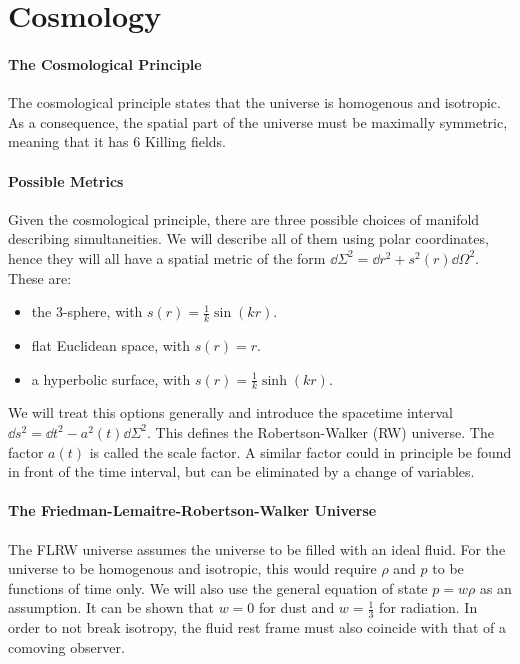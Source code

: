 \section{Cosmology}

\paragraph{The Cosmological Principle}
The cosmological principle states that the universe is homogenous and isotropic. As a consequence, the spatial part of the universe must be maximally symmetric, meaning that it has $6$ Killing fields.

\paragraph{Possible Metrics}
Given the cosmological principle, there are three possible choices of manifold describing simultaneities. We will describe all of them using polar coordinates, hence they will all have a spatial metric of the form $\dd{\Sigma}^{2} = \dd{r}^{2} + s^{2}(r)\dd{\Omega}^{2}$. These are:
\begin{itemize}
	\item the $3$-sphere, with $s(r) = \frac{1}{k}\sin(kr)$.
	\item flat Euclidean space, with $s(r) = r$.
	\item a hyperbolic surface, with $s(r) = \frac{1}{k}\sinh(kr)$.
\end{itemize}

We will treat this options generally and introduce the spacetime interval $\dd{s}^{2} = \dd{t}^{2} - a^{2}(t)\dd{\Sigma}^{2}$. This defines the Robertson-Walker (RW) universe. The factor $a(t)$ is called the scale factor. A similar factor could in principle be found in front of the time interval, but can be eliminated by a change of variables.

\paragraph{The Friedman-Lemaitre-Robertson-Walker Universe}
The FLRW universe assumes the universe to be filled with an ideal fluid. For the universe to be homogenous and isotropic, this would require $\rho$ and $p$ to be functions of time only. We will also use the general equation of state $p = w\rho$ as an assumption. It can be shown that $w = 0$ for dust and $w = \frac{1}{3}$ for radiation. In order to not break isotropy, the fluid rest frame must also coincide with that of a comoving observer.

